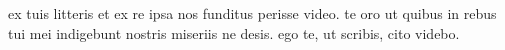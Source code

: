 


ex tuis litteris et ex re ipsa nos funditus perisse video. te oro
            ut quibus in rebus tui mei indigebunt nostris miseriis ne desis. ego te, ut
            scribis, cito videbo.
